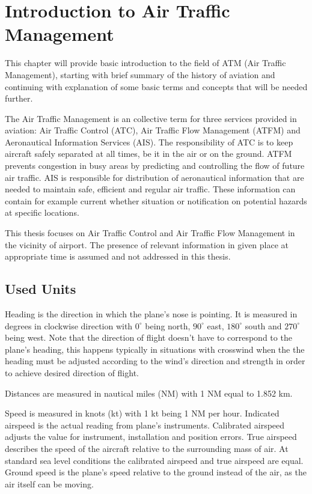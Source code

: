 \chapter{Introduction to Air Traffic Management}

This chapter will provide basic introduction to the field of ATM (Air Traffic Management), starting with brief summary of the history of aviation and continuing with explanation of some basic terms and concepts that will be needed further.

The Air Traffic Management is an collective term for three services provided in aviation: Air Traffic Control (ATC), Air Traffic Flow Management (ATFM) and Aeronautical Information Services (AIS). The responsibility of ATC is to keep aircraft safely separated at all times, be it in the air or on the ground. ATFM prevents congestion in busy areas by predicting and controlling the flow of future air traffic. AIS is responsible for distribution of aeronautical information that are needed to maintain safe, efficient and regular air traffic. These information can contain for example current whether situation or notification on potential hazards at specific locations. \cite{atm}

This thesis focuses on Air Traffic Control and Air Traffic Flow Management in the vicinity of airport. The presence of relevant information in given place at appropriate time is assumed and not addressed in this thesis.







\section{Used Units}

Heading is the direction in which the plane's nose is pointing. It is measured in degrees in clockwise direction with $0 ^{\circ}$ being north, $90 ^{\circ}$ east, $180 ^{\circ}$ south and $270 ^{\circ}$ being west. Note that the direction of flight doesn't have to correspond to the plane's heading, this happens typically in situations with crosswind when the the heading must be adjusted according to the wind's direction and strength in order to achieve desired direction of flight.

Distances are measured in nautical miles (NM) with 1 NM equal to 1.852 km.

Speed is measured in knots (kt) with 1 kt being 1 NM per hour. Indicated airspeed is the actual reading from plane's instruments. Calibrated airspeed adjusts the value for instrument, installation and position errors. True airspeed describes the speed of the aircraft relative to the surrounding mass of air. At standard sea level conditions the calibrated airspeed and true airspeed are equal. Ground speed is the plane's speed relative to the ground instead of the air, as the air itself can be moving.

